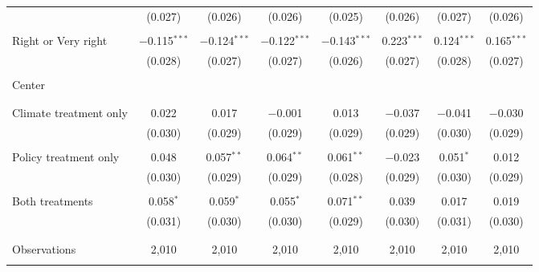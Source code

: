 \begin{tabular}{@{\extracolsep{5pt}}lccccccc}
  & (0.027) & (0.026) & (0.026) & (0.025) & (0.026) & (0.027) & (0.026) \\ 
  & & & & & & & \\ 
 Right or Very right & $-$0.115$^{***}$ & $-$0.124$^{***}$ & $-$0.122$^{***}$ & $-$0.143$^{***}$ & 0.223$^{***}$ & 0.124$^{***}$ & 0.165$^{***}$ \\ 
  & (0.028) & (0.027) & (0.027) & (0.026) & (0.027) & (0.028) & (0.027) \\ 
  & & & & & & & \\ 
 Center &  &  &  &  &  &  &  \\ 
  &  &  &  &  &  &  &  \\ 
  & & & & & & & \\ 
 Climate treatment only & 0.022 & 0.017 & $-$0.001 & 0.013 & $-$0.037 & $-$0.041 & $-$0.030 \\ 
  & (0.030) & (0.029) & (0.029) & (0.029) & (0.029) & (0.030) & (0.029) \\ 
  & & & & & & & \\ 
 Policy treatment only & 0.048 & 0.057$^{**}$ & 0.064$^{**}$ & 0.061$^{**}$ & $-$0.023 & 0.051$^{*}$ & 0.012 \\ 
  & (0.030) & (0.029) & (0.029) & (0.028) & (0.029) & (0.030) & (0.029) \\ 
  & & & & & & & \\ 
 Both treatments & 0.058$^{*}$ & 0.059$^{*}$ & 0.055$^{*}$ & 0.071$^{**}$ & 0.039 & 0.017 & 0.019 \\ 
  & (0.031) & (0.030) & (0.030) & (0.029) & (0.030) & (0.031) & (0.030) \\ 
  & & & & & & & \\ 
\hline \\[-1.8ex] 

Observations & 2,010 & 2,010 & 2,010 & 2,010 & 2,010 & 2,010 & 2,010 \\ 
\hline 
\hline \\[-1.8ex] 
\end{tabular} 